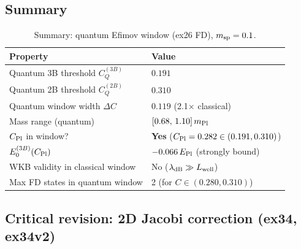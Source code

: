 \subsection{Summary}

\begin{table}[h]
\centering
\caption{Summary: quantum Efimov window (ex26 FD), $m_{\rm sp}=0.1$.}
\label{tab:qm_summary}
\begin{tabular}{ll}
\hline
Property & Value \\
\hline
Quantum 3B threshold $C_Q^{(3B)}$ & $0.191$ \\
Quantum 2B threshold $C_Q^{(2B)}$ & $0.310$ \\
Quantum window width $\Delta C$ & $0.119$ (2.1$\times$ classical) \\
Mass range (quantum) & $[0.68,\,1.10]\,m_{\rm Pl}$ \\
$C_{\rm Pl}$ in window? & \textbf{Yes} ($C_{\rm Pl}=0.282\in(0.191,0.310)$) \\
$E_0^{(3B)}(C_{\rm Pl})$ & $-0.066\,E_{\rm Pl}$ (strongly bound) \\
WKB validity in classical window & No ($\lambda_{\rm dB}\gg L_{\rm well}$) \\
Max FD states in quantum window & 2 (for $C\in(0.280,0.310)$) \\
\hline
\end{tabular}
\end{table}

\subsection{Critical revision: 2D Jacobi correction (ex34, ex34v2)}
\label{ssec:qw_2d_revision}


